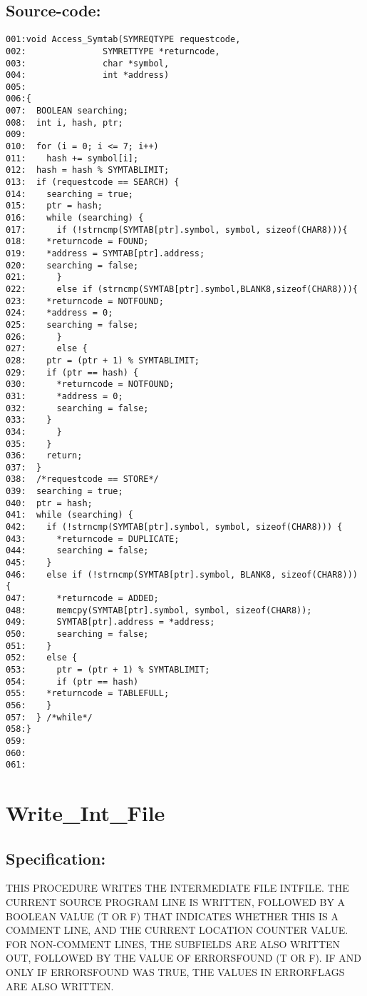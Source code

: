 \subsection*{Source-code:}
\begin{verbatim}
001:void Access_Symtab(SYMREQTYPE requestcode,
002:               SYMRETTYPE *returncode,
003:               char *symbol,
004:               int *address)
005:
006:{
007:  BOOLEAN searching;
008:  int i, hash, ptr;
009:
010:  for (i = 0; i <= 7; i++)
011:    hash += symbol[i];
012:  hash = hash % SYMTABLIMIT;
013:  if (requestcode == SEARCH) {
014:    searching = true;
015:    ptr = hash;
016:    while (searching) {
017:      if (!strncmp(SYMTAB[ptr].symbol, symbol, sizeof(CHAR8))){
018:    *returncode = FOUND;
019:    *address = SYMTAB[ptr].address;
020:    searching = false;
021:      }
022:      else if (strncmp(SYMTAB[ptr].symbol,BLANK8,sizeof(CHAR8))){ 
023:    *returncode = NOTFOUND;
024:    *address = 0;
025:    searching = false;
026:      }
027:      else {
028:    ptr = (ptr + 1) % SYMTABLIMIT;
029:    if (ptr == hash) {
030:      *returncode = NOTFOUND;
031:      *address = 0;
032:      searching = false;
033:    }
034:      }
035:    }
036:    return;
037:  }
038:  /*requestcode == STORE*/
039:  searching = true;
040:  ptr = hash;
041:  while (searching) {
042:    if (!strncmp(SYMTAB[ptr].symbol, symbol, sizeof(CHAR8))) {
043:      *returncode = DUPLICATE;
044:      searching = false;
045:    }
046:    else if (!strncmp(SYMTAB[ptr].symbol, BLANK8, sizeof(CHAR8))) { 
047:      *returncode = ADDED;
048:      memcpy(SYMTAB[ptr].symbol, symbol, sizeof(CHAR8));
049:      SYMTAB[ptr].address = *address;
050:      searching = false;
051:    } 
052:    else {
053:      ptr = (ptr + 1) % SYMTABLIMIT;
054:      if (ptr == hash)
055:    *returncode = TABLEFULL;
056:    }
057:  } /*while*/
058:}
059:
060:
061:
\end{verbatim}
\section{Write\_Int\_File}
\subsection*{Specification:}
THIS PROCEDURE WRITES THE INTERMEDIATE FILE INTFILE.  THE CURRENT SOURCE
PROGRAM LINE IS WRITTEN, FOLLOWED BY A BOOLEAN VALUE (T OR F) THAT INDICATES
WHETHER THIS IS A COMMENT LINE, AND THE CURRENT LOCATION COUNTER VALUE. FOR
NON-COMMENT LINES, THE SUBFIELDS ARE ALSO WRITTEN OUT, FOLLOWED BY THE VALUE
OF ERRORSFOUND (T OR F). IF AND ONLY IF ERRORSFOUND WAS TRUE, THE VALUES IN
ERRORFLAGS ARE ALSO WRITTEN.
